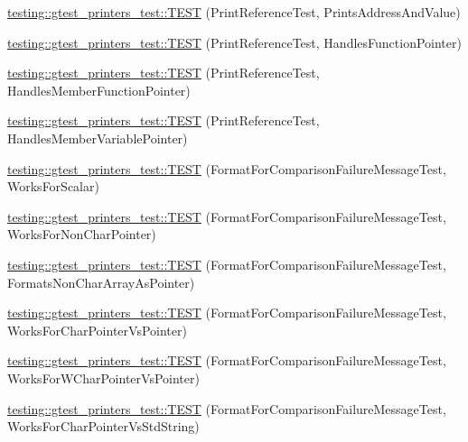 \begin{DoxyCompactItemize}
\item 
\mbox{\hyperlink{namespacetesting_1_1gtest__printers__test_aeae9b61a9fe582c72580db1466631846}{testing\+::gtest\+\_\+printers\+\_\+test\+::\+T\+E\+ST}} (Print\+Reference\+Test, Prints\+Address\+And\+Value)
\item 
\mbox{\hyperlink{namespacetesting_1_1gtest__printers__test_aab47074bb60b087e80675a44ad8c88ba}{testing\+::gtest\+\_\+printers\+\_\+test\+::\+T\+E\+ST}} (Print\+Reference\+Test, Handles\+Function\+Pointer)
\item 
\mbox{\hyperlink{namespacetesting_1_1gtest__printers__test_a88f9089e0b19be4bda74a953d6a47d7b}{testing\+::gtest\+\_\+printers\+\_\+test\+::\+T\+E\+ST}} (Print\+Reference\+Test, Handles\+Member\+Function\+Pointer)
\item 
\mbox{\hyperlink{namespacetesting_1_1gtest__printers__test_af9c63486049ac0ec2a1db65904702eb3}{testing\+::gtest\+\_\+printers\+\_\+test\+::\+T\+E\+ST}} (Print\+Reference\+Test, Handles\+Member\+Variable\+Pointer)
\item 
\mbox{\hyperlink{namespacetesting_1_1gtest__printers__test_aa7429c3701e464d0047a82686a5e8a46}{testing\+::gtest\+\_\+printers\+\_\+test\+::\+T\+E\+ST}} (Format\+For\+Comparison\+Failure\+Message\+Test, Works\+For\+Scalar)
\item 
\mbox{\hyperlink{namespacetesting_1_1gtest__printers__test_adb093d9323bfb766be8c91215c46056e}{testing\+::gtest\+\_\+printers\+\_\+test\+::\+T\+E\+ST}} (Format\+For\+Comparison\+Failure\+Message\+Test, Works\+For\+Non\+Char\+Pointer)
\item 
\mbox{\hyperlink{namespacetesting_1_1gtest__printers__test_a3571808f93f419268b6aed1aa127ea30}{testing\+::gtest\+\_\+printers\+\_\+test\+::\+T\+E\+ST}} (Format\+For\+Comparison\+Failure\+Message\+Test, Formats\+Non\+Char\+Array\+As\+Pointer)
\item 
\mbox{\hyperlink{namespacetesting_1_1gtest__printers__test_a1694d4063da702f5379495d3cb2cbc91}{testing\+::gtest\+\_\+printers\+\_\+test\+::\+T\+E\+ST}} (Format\+For\+Comparison\+Failure\+Message\+Test, Works\+For\+Char\+Pointer\+Vs\+Pointer)
\item 
\mbox{\hyperlink{namespacetesting_1_1gtest__printers__test_a735171f4ba0a9dffee9c4c7321107822}{testing\+::gtest\+\_\+printers\+\_\+test\+::\+T\+E\+ST}} (Format\+For\+Comparison\+Failure\+Message\+Test, Works\+For\+W\+Char\+Pointer\+Vs\+Pointer)
\item 
\mbox{\hyperlink{namespacetesting_1_1gtest__printers__test_ab5a910170489276c14b817b70d4feb96}{testing\+::gtest\+\_\+printers\+\_\+test\+::\+T\+E\+ST}} (Format\+For\+Comparison\+Failure\+Message\+Test, Works\+For\+Char\+Pointer\+Vs\+Std\+String)

\end{DoxyCompactItemize}
